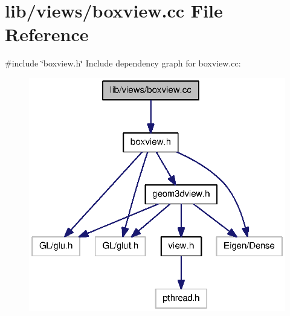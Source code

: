 \section{lib/views/boxview.cc \-File \-Reference}
\label{boxview_8cc}
{\ttfamily \#include \char`\"{}boxview.\-h\char`\"{}}\*
\-Include dependency graph for boxview.\-cc\-:\nopagebreak
\begin{figure}[H]
\begin{center}
\leavevmode
\includegraphics[width=322pt]{boxview_8cc__incl}
\end{center}
\end{figure}
